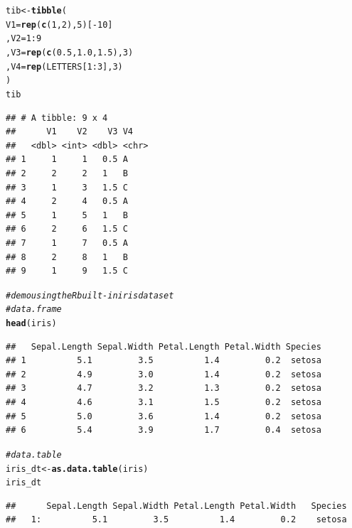 \documentclass[11pt]{article}\usepackage[]{graphicx}\usepackage[]{color}
\makeatletter
\newcommand{\hlnum}[1]{\textcolor[rgb]{0.686,0.059,0.569}{#1}}%
\newcommand{\hlcom}[1]{\textcolor[rgb]{0.678,0.584,0.686}{\textit{#1}}}%
\newcommand{\hlopt}[1]{\textcolor[rgb]{0,0,0}{#1}}%
\newcommand{\hlstd}[1]{\textcolor[rgb]{0.345,0.345,0.345}{#1}}%
\newcommand{\hlkwb}[1]{\textcolor[rgb]{0.69,0.353,0.396}{#1}}%
\newcommand{\hlkwc}[1]{\textcolor[rgb]{0.333,0.667,0.333}{#1}}%
\newcommand{\hlkwd}[1]{\textcolor[rgb]{0.737,0.353,0.396}{\textbf{#1}}}%
\newenvironment{kframe}{%
 \def\at@end@of@kframe{}%
 \ifinner\ifhmode%
  \def\at@end@of@kframe{\end{minipage}}%
  \begin{minipage}{\columnwidth}%
 \fi\fi%
 \def\FrameCommand##1{\hskip\@totalleftmargin \hskip-\fboxsep
 \colorbox{shadecolor}{##1}\hskip-\fboxsep
     \hskip-\linewidth \hskip-\@totalleftmargin \hskip\columnwidth}%
 \MakeFramed {\advance\hsize-\width
   \@totalleftmargin\z@ \linewidth\hsize
   \@setminipage}}%
 {\par\unskip\endMakeFramed%
 \at@end@of@kframe}
\newenvironment{knitrout}{}{} %
\makeatother
\begin{document}
\begin{knitrout}
\begin{kframe}
{\ttfamily\noindent\bfseries\color{errorcolor}{\#\# Error: Tibble columns must have compatible sizes.\\\#\# * Size 9: Existing data.\\\#\# * Size 3: Column `V3`.\\\#\# i Only values of size one are recycled.}}\begin{alltt}
\hlstd{tib} \hlkwb{<-} \hlkwd{tibble}\hlstd{(}
          \hlkwc{V1} \hlstd{=} \hlkwd{rep}\hlstd{(}\hlkwd{c}\hlstd{(}\hlnum{1}\hlstd{,} \hlnum{2}\hlstd{),} \hlnum{5}\hlstd{)[}\hlopt{-}\hlnum{10}\hlstd{]}
        \hlstd{,} \hlkwc{V2} \hlstd{=} \hlnum{1}\hlopt{:}\hlnum{9}
        \hlstd{,} \hlkwc{V3} \hlstd{=} \hlkwd{rep}\hlstd{(}\hlkwd{c}\hlstd{(}\hlnum{0.5}\hlstd{,} \hlnum{1.0}\hlstd{,} \hlnum{1.5}\hlstd{),} \hlnum{3}\hlstd{)}
        \hlstd{,} \hlkwc{V4} \hlstd{=} \hlkwd{rep}\hlstd{(LETTERS[}\hlnum{1}\hlopt{:}\hlnum{3}\hlstd{],} \hlnum{3}\hlstd{)}
        \hlstd{)}
\hlstd{tib}
\end{alltt}
\begin{verbatim}
## # A tibble: 9 x 4
##      V1    V2    V3 V4   
##   <dbl> <int> <dbl> <chr>
## 1     1     1   0.5 A    
## 2     2     2   1   B    
## 3     1     3   1.5 C    
## 4     2     4   0.5 A    
## 5     1     5   1   B    
## 6     2     6   1.5 C    
## 7     1     7   0.5 A    
## 8     2     8   1   B    
## 9     1     9   1.5 C
\end{verbatim}
\begin{alltt}
\hlcom{# demo using the R built-in iris data set}
\hlcom{# data.frame}
\hlkwd{head}\hlstd{(iris)}
\end{alltt}
\begin{verbatim}
##   Sepal.Length Sepal.Width Petal.Length Petal.Width Species
## 1          5.1         3.5          1.4         0.2  setosa
## 2          4.9         3.0          1.4         0.2  setosa
## 3          4.7         3.2          1.3         0.2  setosa
## 4          4.6         3.1          1.5         0.2  setosa
## 5          5.0         3.6          1.4         0.2  setosa
## 6          5.4         3.9          1.7         0.4  setosa
\end{verbatim}
\begin{alltt}
\hlcom{# data.table}
\hlstd{iris_dt} \hlkwb{<-} \hlkwd{as.data.table}\hlstd{(iris)}
\hlstd{iris_dt}
\end{alltt}
\begin{verbatim}
##      Sepal.Length Sepal.Width Petal.Length Petal.Width   Species
##   1:          5.1         3.5          1.4         0.2    setosa

\end{verbatim}
\end{kframe}
\end{knitrout}
\end{document}
